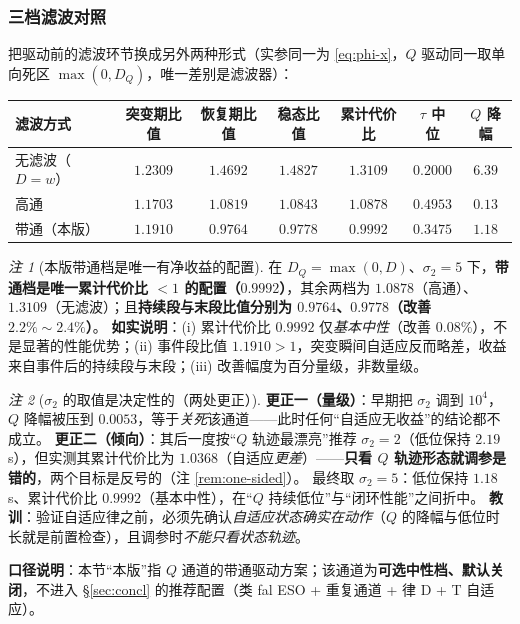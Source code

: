 \documentclass[11pt,a4paper]{article}
\theoremstyle{remark}\newtheorem{remark}{注}
\begin{document}
\subsubsection{三档滤波对照}
把驱动前的滤波环节换成另外两种形式（实参同一为 \eqref{eq:phi-x}，$Q$ 驱动同一取单向死区 $\max(0,D_Q)$，唯一差别是滤波器）：
\begin{center}
\small
\begin{tabular}{@{}lcccccc@{}}
\toprule
滤波方式 & 突变期比值 & 恢复期比值 & 稳态比值 & 累计代价比 & $\tau$ 中位 & $Q$ 降幅 \\
\midrule
无滤波（$D=w$） & $1.2309$ & $1.4692$ & $1.4827$ & $1.3109$ & $0.2000$ & $6.39$ \\
高通 & $1.1703$ & $1.0819$ & $1.0843$ & $1.0878$ & $0.4953$ & $0.13$ \\
带通（本版） & $1.1910$ & $\mathbf{0.9764}$ & $\mathbf{0.9778}$ & $\mathbf{0.9992}$ & $0.3475$ & $1.18$ \\
\bottomrule
\end{tabular}
\end{center}
\begin{remark}[本版带通档是唯一有净收益的配置]\label{rem:bpw-result}
在 $D_Q=\max(0,D)$、$\sigma_2=5$ 下，\textbf{带通档是唯一累计代价比 $<1$ 的配置（$0.9992$）}，其余两档为 $1.0878$（高通）、$1.3109$（无滤波）；且\textbf{持续段与末段比值分别为 $0.9764$、$0.9778$（改善 $2.2\%\sim2.4\%$）}。
\textbf{如实说明}：(i) 累计代价比 $0.9992$ 仅\emph{基本中性}（改善 $0.08\%$），不是显著的性能优势；(ii) 事件段比值 $1.1910>1$，突变瞬间自适应反而略差，收益来自事件后的持续段与末段；(iii) 改善幅度为百分量级，非数量级。
\end{remark}

\begin{remark}[$\sigma_2$ 的取值是决定性的（两处更正）]\label{rem:correction}
\textbf{更正一（量级）}：早期把 $\sigma_2$ 调到 $10^{4}$，$Q$ 降幅被压到 $0.0053$，等于\emph{关死}该通道——此时任何“自适应无收益”的结论都不成立。
\textbf{更正二（倾向）}：其后一度按“$Q$ 轨迹最漂亮”推荐 $\sigma_2=2$（低位保持 $2.19$ s），但实测其累计代价比为 $1.0368$（自适应\emph{更差}）——\textbf{只看 $Q$ 轨迹形态就调参是错的}，两个目标是反号的（注 \ref{rem:one-sided}）。
最终取 $\sigma_2=5$：低位保持 $1.18$ s、累计代价比 $0.9992$（基本中性），在“$Q$ 持续低位”与“闭环性能”之间折中。
\textbf{教训}：验证自适应律之前，必须先确认\emph{自适应状态确实在动作}（$Q$ 的降幅与低位时长就是前置检查），且调参时\emph{不能只看状态轨迹}。
\end{remark}

\noindent\textbf{口径说明}：本节“本版”指 $Q$ 通道的带通驱动方案；该通道为\textbf{可选中性档、默认关闭}，不进入 §\ref{sec:concl} 的推荐配置（类 fal ESO + 重复通道 + 律 D + T 自适应）。
\end{document}
